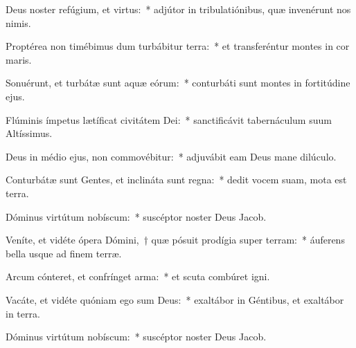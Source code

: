 \item Deus noster refúgium, et virtus:~* adjútor in tribulatiónibus, quæ invenérunt nos nimis.

\item Proptérea non timébimus dum turbábitur terra:~* et transferéntur montes in cor maris.

\item Sonuérunt, et turbátæ sunt aquæ eórum:~* conturbáti sunt montes in fortitúdine ejus.

\item Flúminis ímpetus lætíficat civitátem Dei:~* sanctificávit tabernáculum suum Altíssimus.

\item Deus in médio ejus, non commovébitur:~* adjuvábit eam Deus mane dilúculo.

\item Conturbátæ sunt Gentes, et inclináta sunt regna:~* dedit vocem suam, mota est terra.

\item Dóminus virtútum nobíscum:~* suscéptor noster Deus Jacob.

\item Veníte, et vidéte ópera Dómini,~† quæ pósuit prodígia super terram:~* áuferens bella usque ad finem terræ.

\item Arcum cónteret, et confrínget arma:~* et scuta combúret igni.

\item Vacáte, et vidéte quóniam ego sum Deus:~* exaltábor in Géntibus, et exaltábor in terra.

\item Dóminus virtútum nobíscum:~* suscéptor noster Deus Jacob.
